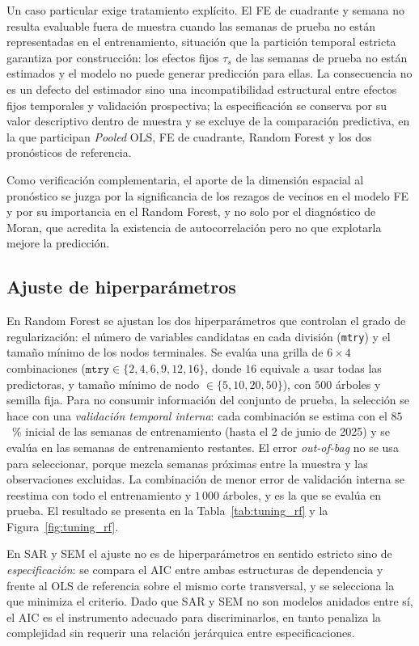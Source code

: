 Un caso particular exige tratamiento explícito. El FE de cuadrante y semana no resulta evaluable fuera de muestra cuando las semanas de prueba no están representadas en el entrenamiento, situación que la partición temporal estricta garantiza por construcción: los efectos fijos $\tau_s$ de las semanas de prueba no están estimados y el modelo no puede generar predicción para ellas. La consecuencia no es un defecto del estimador sino una incompatibilidad estructural entre efectos fijos temporales y validación prospectiva; la especificación se conserva por su valor descriptivo dentro de muestra y se excluye de la comparación predictiva, en la que participan \emph{Pooled} OLS, FE de cuadrante, Random Forest y los dos pronósticos de referencia.

Como verificación complementaria, el aporte de la dimensión espacial al pronóstico se juzga por la significancia de los rezagos de vecinos en el modelo FE y por su importancia en el Random Forest, y no solo por el diagnóstico de Moran, que acredita la existencia de autocorrelación pero no que explotarla mejore la predicción.

\subsection{Ajuste de hiperparámetros}
\label{sec:ajuste_hiperparametros}
En Random Forest se ajustan los dos hiperparámetros que controlan el grado de regularización: el número de variables candidatas en cada división (\texttt{mtry}) y el tamaño mínimo de los nodos terminales. Se evalúa una grilla de $6\times4$ combinaciones ($\texttt{mtry}\in\{2,4,6,9,12,16\}$, donde $16$ equivale a usar todas las predictoras, y tamaño mínimo de nodo $\in\{5,10,20,50\}$), con $500$ árboles y semilla fija. Para no consumir información del conjunto de prueba, la selección se hace con una \textit{validación temporal interna}: cada combinación se estima con el $85$~\% inicial de las semanas de entrenamiento (hasta el 2 de junio de 2025) y se evalúa en las semanas de entrenamiento restantes. El error \emph{out-of-bag} no se usa para seleccionar, porque mezcla semanas próximas entre la muestra y las observaciones excluidas. La combinación de menor error de validación interna se reestima con todo el entrenamiento y $1\,000$ árboles, y es la que se evalúa en prueba. El resultado se presenta en la Tabla~\ref{tab:tuning_rf} y la Figura~\ref{fig:tuning_rf}.

En SAR y SEM el ajuste no es de hiperparámetros en sentido estricto sino de \textit{especificación}: se compara el AIC entre ambas estructuras de dependencia y frente al OLS de referencia sobre el mismo corte transversal, y se selecciona la que minimiza el criterio. Dado que SAR y SEM no son modelos anidados entre sí, el AIC es el instrumento adecuado para discriminarlos, en tanto penaliza la complejidad sin requerir una relación jerárquica entre especificaciones.

